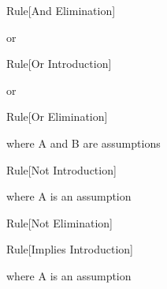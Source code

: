 \begin{namedthm}{Rule}[And Elimination]

\begin{bprooftree}
\end{bprooftree}\qquad or \qquad
\begin{bprooftree}
\end{bprooftree}

\end{namedthm}

\begin{namedthm}{Rule}[Or Introduction]

\begin{bprooftree}
\end{bprooftree}\qquad or \qquad
\begin{bprooftree}
\end{bprooftree}

\end{namedthm}

\begin{namedthm}{Rule}[Or Elimination]

\begin{bprooftree}
\end{bprooftree}\qquad where A and B are assumptions

\end{namedthm}

\begin{namedthm}{Rule}[Not Introduction]

\begin{bprooftree}
\end{bprooftree}\qquad where A is an assumption

\end{namedthm}

\begin{namedthm}{Rule}[Not Elimination]

\begin{bprooftree}
\end{bprooftree}\qquad 

\end{namedthm}

\begin{namedthm}{Rule}[Implies Introduction]

\begin{bprooftree}
\end{bprooftree}\qquad where A is an assumption

\end{namedthm}

